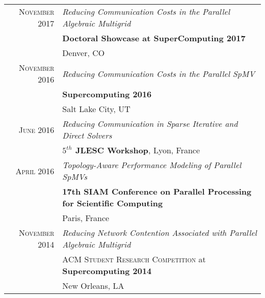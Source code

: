 \documentclass[a4paper,10pt]{article} %
\begin{document}
\begin{longtable}{rl}	

\textsc{November} 2017
    &\emph{Reducing Communication Costs in the Parallel Algebraic Multigrid}\\
    &\normalsize\textbf{Doctoral Showcase at SuperComputing 2017}\\
    &Denver, CO\\


\textsc{November} 2016
    &\emph{Reducing Communication Costs in the Parallel SpMV}\\
    &\normalsize\textbf{Supercomputing 2016}\\
    & Salt Lake City, UT\\


\textsc{June} 2016
    &\emph{Reducing Communication in Sparse Iterative and Direct Solvers}\\
    &\normalsize\textbf{$5^{th}$ JLESC Workshop}, Lyon, France\\


\textsc{April} 2016
    &\emph{Topology-Aware Performance Modeling of Parallel SpMVs}\\
    &\normalsize\textbf{17th SIAM Conference on Parallel Processing for Scientific Computing}\\
    &Paris, France\\


\textsc{November} 2014 
    &\emph{Reducing Network Contention Associated with Parallel Algebraic Multigrid}\\
    &\textsc{ACM Student Research Competition} at \normalsize\textbf{Supercomputing 2014}\\
    &New Orleans, LA\\


\end{longtable}


\end{document}
